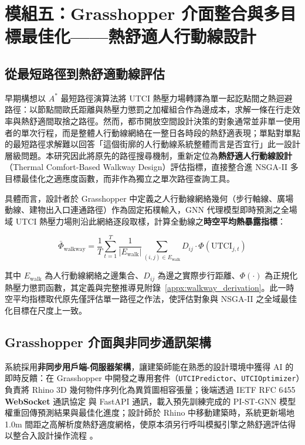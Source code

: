 \section{模組五：Grasshopper 介面整合與多目標最佳化——熱舒適人行動線設計}
\label{sec:nsga2}

\subsection{從最短路徑到熱舒適動線評估}
\label{subsec:from_astar_to_walkway}

早期構想以 $A^*$ 最短路徑演算法將 UTCI 熱壓力場轉譯為單一起訖點間之熱迴避路徑：以節點間歐氏距離與熱壓力懲罰之加權組合作為邊成本，求解一條在行走效率與熱舒適間取捨之路徑。然而，都市開放空間設計決策的對象通常並非單一使用者的單次行程，而是整體人行動線網絡在一整日各時段的熱舒適表現；單點對單點的最短路徑求解難以回答「這個街廓的人行動線系統整體而言是否宜行」此一設計層級問題。本研究因此將原先的路徑搜尋機制，重新定位為\textbf{熱舒適人行動線設計}（Thermal Comfort-Based Walkway Design）評估指標，直接整合進 NSGA-II 多目標最佳化之適應度函數，而非作為獨立之單次路徑查詢工具。

具體而言，設計者於 Grasshopper 中定義之人行動線網絡幾何（步行軸線、廣場動線、建物出入口連通路徑）作為固定拓樸輸入，GNN 代理模型即時預測之全場域 UTCI 熱壓力場則沿此網絡逐段取樣，計算全動線之\textbf{時空平均熱暴露指標}：

\begin{equation}
    \bar{\Phi}_{\text{walkway}} = \frac{1}{T}\sum_{t=1}^{T} \frac{1}{|E_{\text{walk}}|}
    \sum_{(i,j) \in E_{\text{walk}}} D_{ij}\cdot \Phi\!\left(\text{UTCI}_{j,t}\right)
    \label{eq:walkway_exposure}
\end{equation}

其中 $E_{\text{walk}}$ 為人行動線網絡之邊集合、$D_{ij}$ 為邊之實際步行距離、$\Phi(\cdot)$ 為正規化熱壓力懲罰函數，其定義與完整推導見附錄~\ref{appx:walkway_derivation}。此一時空平均指標取代原先僅評估單一路徑之作法，使評估對象與 NSGA-II 之全域最佳化目標在尺度上一致。


\subsection{Grasshopper 介面與非同步通訊架構}
\label{subsec:gh_integration}

系統採用\textbf{非同步用戶端-伺服器架構}，讓建築師能在熟悉的設計環境中獲得 AI 的即時反饋：在 Grasshopper 中開發之專用套件（\texttt{UTCIPredictor}、\texttt{UTCIOptimizer}）負責將 Rhino 3D 幾何物件序列化為異質圖相容張量；後端透過 IETF RFC 6455 \textbf{WebSocket} 通訊協定 \citep{rfc6455} 與 FastAPI 通訊，載入預先訓練完成的 PI-ST-GNN 模型權重回傳預測結果與最佳化進度；設計師於 Rhino 中移動建築時，系統更新場地 1.0m 間距之高解析度熱舒適度網格，使原本須另行呼叫模擬引擎之熱舒適評估得以整合入設計操作流程 \citep{sadeghipour2013ladybug}。

